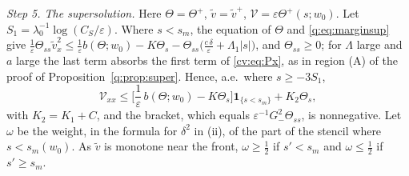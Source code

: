 \documentclass[11pt]{amsart}
\theoremstyle{definition}
\theoremstyle{remark}
\newcommand{\ve}{\varepsilon}
\begin{document}
\emph{Step 5. The supersolution.} Here $\Theta=\Theta^+$, $\tilde v=\tilde v^+$, $\mathcal V=\ve\Theta^+(s;w_0)$. Let
$S_1=\lambda_0^{-1}\log(C_S/\ve)$. Where $s<s_m$, the equation of $\Theta$ and \eqref{q:eq:marginsup} give
$\frac1\ve\Theta_{ss}\tilde v_x^2\le\frac1\ve b(\Theta;w_0)-K\Theta_s-\Theta_{ss}\big(\frac{c\,\delta}\ve+\Lambda_1|s|\big)$, and
$\Theta_{ss}\ge0$; for $\Lambda$ large and $a$ large the last term absorbs the first term of
\eqref{cv:eq:Px}, as in region (A) of the proof of Proposition~\ref{q:prop:super}. Hence, a.e.\
where $s\ge-3S_1$,
\begin{equation}\label{cv:eq:Vxx}
\mathcal V_{xx}\le\Big[\frac1\ve\,b(\Theta;w_0)-K\Theta_s\Big]\mathbf 1_{\{s<s_m\}}+K_2\Theta_s ,
\end{equation}
with $K_2=K_1+C$, and the bracket, which equals $\ve^{-1}G_-^2\Theta_{ss}$, is nonnegative. Let
$\omega$ be the weight, in the
formula for $\delta^2$ in (ii), of the part of the stencil where $s<s_m(w_0)$. As $\tilde v$ is
monotone near the front, $\omega\ge\frac12$ if $s'<s_m$ and $\omega\le\frac12$ if $s'\ge s_m$.
\end{document}
